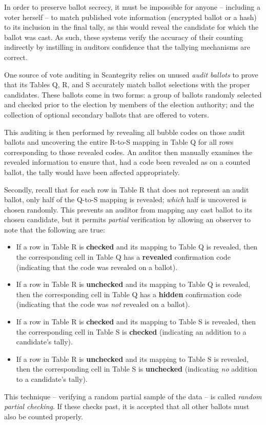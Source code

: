 \documentclass[10pt,twocolumn]{article}
\newcommand{\term}[1]{\textit{#1}}
\begin{document}
In order to preserve ballot secrecy, it must be impossible for anyone -- including a voter
herself -- to match published vote information (encrypted ballot or a hash) to its inclusion in
the final tally, as this would reveal the candidate for which the ballot was cast. As such, these
systems verify the accuracy of their counting indirectly by instilling in auditors confidence that
the tallying mechanisms are correct.

One source of vote auditing in Scantegrity relies on unused \term{audit ballots} to prove that its
Tables Q, R, and S accurately match ballot selections with the proper candidates. These ballots come
in two forms: a group of ballots randomly selected and checked prior to the election by members of
the election authority; and the collection of optional secondary ballots that are offered to voters.

This auditing is then performed by revealing all bubble codes on those audit ballots and uncovering the
entire R-to-S mapping in Table Q for all rows corresponding to those revealed codes. An auditor then
manually examines the revealed information to ensure that, had a code been revealed as on a counted
ballot, the tally would have been affected appropriately.

Secondly, recall that for each row in Table R that does not represent an audit ballot, only half of
the Q-to-S mapping is revealed; \emph{which} half is uncovered is chosen randomly. This prevents an
auditor from mapping any cast ballot to its chosen candidate, but it permits \emph{partial}
verification by allowing an observer to note that the following are true:
\begin{itemize}
	\item
		If a row in Table R is \textbf{checked} and its mapping to Table Q is revealed, then the
		corresponding cell in Table Q has a \textbf{revealed} confirmation code (indicating that the
		code was revealed on a ballot).
	\item
		If a row in Table R is \textbf{unchecked} and its mapping to Table Q is revealed, then the
		corresponding cell in Table Q has a \textbf{hidden} confirmation code (indicating that the code
		was \emph{not} revealed on a ballot).
	\item
		If a row in Table R is \textbf{checked} and its mapping to Table S is revealed, then the
		corresponding cell in Table S is \textbf{checked} (indicating an addition to a candidate's
		tally).
	\item
		If a row in Table R is \textbf{unchecked} and its mapping to Table S is revealed, then the
		corresponding cell in Table S is \textbf{unchecked} (indicating \emph{no} addition to a
		candidate's tally).
\end{itemize}
This technique -- verifying a random partial sample of the data -- is called \term{random partial
checking}. If these checks past, it is accepted that all other ballots must also be counted properly.
\end{document}
